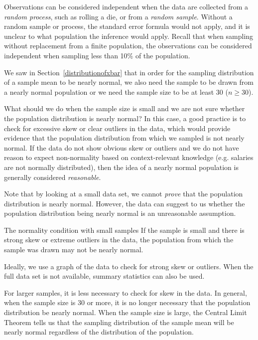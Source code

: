 \begin{description}
\setlength{\itemsep}{0mm}
\item[Independence.]
  Observations can be considered independent when the data are
  collected from a \emph{random process}, such as rolling a die,
  or from a \emph{random sample}.
  Without a random sample or process, the standard error formula
  would not apply, and it is unclear to what population the
  inference would apply.
  Recall that when sampling without replacement from a finite
  population, the observations can be considered independent when
  sampling less than 10\% of the population.  
\item[Large sample / normal population.]
  We saw in Section~\ref{distributionofxbar} that in order for
  the sampling distribution of a sample mean to be nearly normal,
  we also need the sample to be drawn from a nearly normal population
  or we need the sample size to be at least 30 ($n\ge 30$).     
\end{description}

What should we do when the sample size is small and we are not sure whether the population distribution is nearly normal?  In this case, a good practice is to check for excessive skew or clear outliers in the data, which would provide evidence that the population distribution from which we sampled is not nearly normal.  If the data do not show obvious skew or outliers and we do not have reason to expect non-normality based on context-relevant knowledge (e.g. salaries are not normally distributed), then the idea of a nearly normal population is generally considered \emph{reasonable}.  

Note that by looking at a small data set, we cannot \emph{prove} that the population distribution is nearly normal.  However, the data can suggest to us whether the population distribution being nearly normal is an unreasonable assumption.  

\begin{onebox}{The normality condition with small samples}
{If the sample is small and there is strong skew or extreme outliers in the data, the population from which the sample was drawn may not be nearly normal. }
\end{onebox}

Ideally, we use a graph of the data to check for strong skew or outliers.  When the full data set is not available, summary statistics can also be used. 

For larger samples, it is less necessary to check for skew in the data.  In general, when the sample size is 30 or more, it is no longer necessary that the population distribution be nearly normal.  When the sample size is large, the Central Limit Theorem tells us that the sampling distribution of the sample mean will be nearly normal regardless of the distribution of the population.



